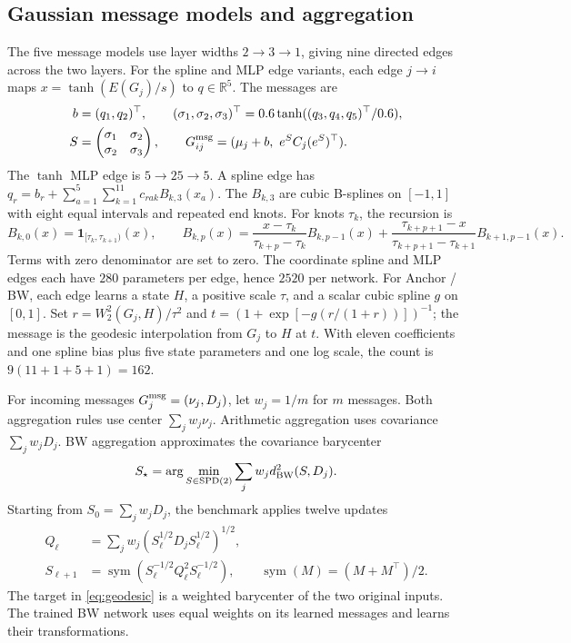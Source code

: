 \documentclass[11pt]{article}
\let\StudyMathSubsection\subsection
\newcommand{\R}{\mathbb{R}}
\newcommand{\SPD}{\operatorname{SPD}}
\newcommand{\sym}{\operatorname{sym}}
\begin{document}
\StudyMathSubsection{Gaussian message models and aggregation}

The five message models use layer widths \(2\to3\to1\), giving nine
directed edges across the two layers. For the spline and MLP edge
variants, each edge \(j\to i\) maps
\(x=\tanh(E(G_j)/s)\) to \(q\in\R^5\). The messages are
\begin{align*}
 b&=(q_1,q_2)^\top,\qquad
 (\sigma_1,\sigma_2,\sigma_3)^\top=0.6\tanh((q_3,q_4,q_5)^\top/0.6),\\
 S&=\begin{pmatrix}\sigma_1&\sigma_2\\\sigma_2&\sigma_3\end{pmatrix},
 \qquad
 G_{ij}^{\rm msg}=(\mu_j+b,\ e^S C_j(e^S)^\top).
\end{align*}
The \(\tanh\) MLP edge is \(5\to25\to5\). A spline edge has
\(q_r=b_r+\sum_{a=1}^{5}\sum_{k=1}^{11}c_{rak}B_{k,3}(x_a)\).
The \(B_{k,3}\) are cubic B-splines on \([-1,1]\) with eight equal
intervals and repeated end knots. For knots \(\tau_k\), the recursion is
\[
 B_{k,0}(x)=\mathbf{1}_{[\tau_k,\tau_{k+1})}(x),\qquad
 B_{k,p}(x)=
 \frac{x-\tau_k}{\tau_{k+p}-\tau_k}B_{k,p-1}(x)
 +\frac{\tau_{k+p+1}-x}{\tau_{k+p+1}-\tau_{k+1}}B_{k+1,p-1}(x).
\]
Terms with zero denominator are set to zero. The coordinate spline and
MLP edges each have \(280\) parameters per edge, hence \(2520\) per
network. For Anchor / BW, each edge learns a state \(H\), a positive
scale \(\tau\), and a scalar cubic spline \(g\) on \([0,1]\).
Set \(r=W_2^2(G_j,H)/\tau^2\) and
\(t=(1+\exp[-g(r/(1+r))])^{-1}\); the message is the geodesic
interpolation from \(G_j\) to \(H\) at \(t\). With eleven coefficients
and one spline bias plus five state parameters and one log scale,
the count is \(9(11+1+5+1)=162\).

For incoming messages \(G_j^{\rm msg}=(\nu_j,D_j)\), let \(w_j=1/m\)
for \(m\) messages. Both aggregation rules use center \(\sum_jw_j\nu_j\).
Arithmetic aggregation uses covariance \(\sum_jw_jD_j\). BW aggregation
approximates the covariance barycenter
\[
 S_\star=\arg\min_{S\in\SPD(2)}\sum_j w_j d_{\rm BW}^2(S,D_j).
\]
Starting from \(S_0=\sum_jw_jD_j\), the benchmark applies twelve updates
\begin{align*}
 Q_\ell&=\sum_jw_j(S_\ell^{1/2}D_j S_\ell^{1/2})^{1/2},\\
 S_{\ell+1}&=\sym(S_\ell^{-1/2}Q_\ell^2S_\ell^{-1/2}),\qquad
 \sym(M)=(M+M^\top)/2 .
\end{align*}
The target in \eqref{eq:geodesic} is a weighted barycenter of the two
original inputs. The trained BW network uses equal weights on its learned
messages and learns their transformations.
\end{document}

